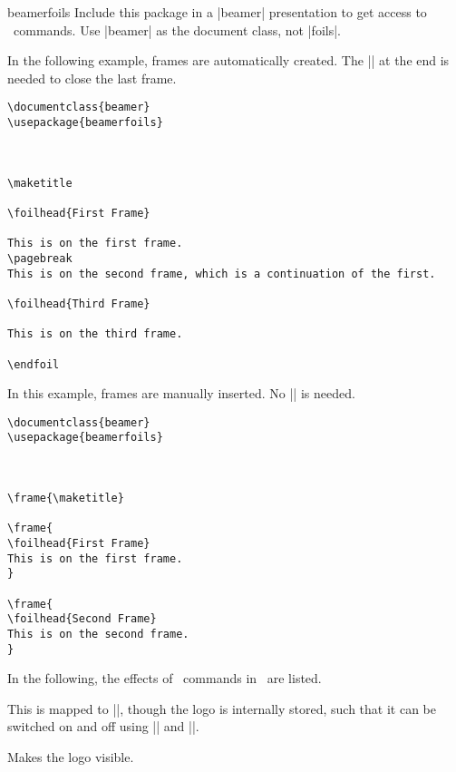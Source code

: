 \begin{package}{{beamerfoils}}
  Include this package in a |beamer| presentation to get access to \foils\ commands. Use |beamer| as the document class, not |foils|.

  \example
  In the following example, frames are automatically created. The |\endfoil| at the end is needed to close the last frame.
\begin{verbatim}
\documentclass{beamer}
\usepackage{beamerfoils}



\maketitle

\foilhead{First Frame}

This is on the first frame.
\pagebreak
This is on the second frame, which is a continuation of the first.

\foilhead{Third Frame}

This is on the third frame.

\endfoil

\end{verbatim}

  \example
  In this example, frames are manually inserted. No |\endfoil| is needed.
\begin{verbatim}
\documentclass{beamer}
\usepackage{beamerfoils}



\frame{\maketitle}

\frame{
\foilhead{First Frame}
This is on the first frame.
}

\frame{
\foilhead{Second Frame}
This is on the second frame.
}

\end{verbatim}
\end{package}

In the following, the effects of \foils\ commands in \beamer\ are listed.

\begin{command}{\MyLogo{}}
  This is mapped to |\logo|, though the logo is internally stored, such that it can be switched on and off using |\LogoOn| and |\LogoOff|.
\end{command}

\begin{command}{\LogoOn}
  Makes the logo visible.
\end{command}


